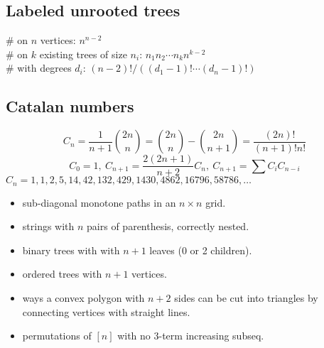 


	\subsection{Labeled unrooted trees}
		\# on $n$ vertices: $n^{n-2}$ \\
		\# on $k$ existing trees of size $n_i$: $n_1n_2\cdots n_k n^{k-2}$ \\
		\# with degrees $d_i$: $(n-2)! / ((d_1-1)! \cdots (d_n-1)!)$

	\subsection{Catalan numbers}
		\[ C_n=\frac{1}{n+1}\binom{2n}{n}= \binom{2n}{n}-\binom{2n}{n+1} = \frac{(2n)!}{(n+1)!n!} \]
		\[ C_0=1,\ C_{n+1} = \frac{2(2n+1)}{n+2}C_n,\ C_{n+1}=\sum C_iC_{n-i} \]
		${C_n = 1, 1, 2, 5, 14, 42, 132, 429, 1430, 4862, 16796, 58786, \dots}$
		\begin{itemize}[noitemsep]
			\item sub-diagonal monotone paths in an $n\times n$ grid.
			\item strings with $n$ pairs of parenthesis, correctly nested.
			\item binary trees with with $n+1$ leaves (0 or 2 children).
			\item ordered trees with $n+1$ vertices.
			\item ways a convex polygon with $n+2$ sides can be cut into triangles by connecting vertices with straight lines.
			\item permutations of $[n]$ with no 3-term increasing subseq.
		\end{itemize}
